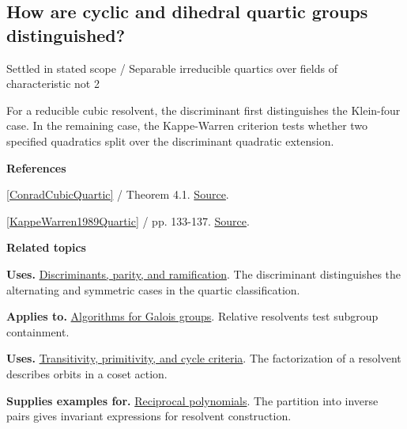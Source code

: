 \documentclass[11pt,a4paper,oneside,openany]{book}
\newenvironment{sources}{\par\smallskip\begingroup\footnotesize\color{atlasgray}\leftskip=10pt\setlength{\parskip}{2pt}}{\par\endgroup\smallskip}
\begin{document}
\subsection*{How are cyclic and dihedral quartic groups distinguished?}
{\small\sffamily\color{atlasgold}Settled in stated scope / Separable irreducible quartics over fields of characteristic not 2}\par\smallskip
\color{black} For a reducible cubic resolvent, the discriminant first distinguishes the Klein-four case. In the remaining case, the Kappe-Warren criterion tests whether two specified quadratics split over the discriminant quadratic extension.\par
\begin{sources}
\textbf{References}\par\smallskip
\noindent\hyperlink{ref:ConradCubicQuartic}{[ConradCubicQuartic]} / Theorem 4.1.  \href{https://kconrad.math.uconn.edu/blurbs/galoistheory/cubicquartic.pdf}{Source}.\par
\noindent\hyperlink{ref:KappeWarren1989Quartic}{[KappeWarren1989Quartic]} / pp. 133-137.  \href{https://www.jstor.org/stable/2323198}{Source}.\par
\end{sources}\color{black}
\par\medskip\begingroup\footnotesize\setlength{\parskip}{1pt}\textbf{\sffamily\color{atlasgreen}Related topics}\par
\color{black}\textbf{Uses.} \hyperlink{article:discriminants}{Discriminants, parity, and ramification}. The discriminant distinguishes the alternating and symmetric cases in the quartic classification.\par
\color{black}\textbf{Applies to.} \hyperlink{article:galois-computation}{Algorithms for Galois groups}. Relative resolvents test subgroup containment.\par
\color{black}\textbf{Uses.} \hyperlink{article:permutation-groups}{Transitivity, primitivity, and cycle criteria}. The factorization of a resolvent describes orbits in a coset action.\par
\color{black}\textbf{Supplies examples for.} \hyperlink{article:reciprocity}{Reciprocal polynomials}. The partition into inverse pairs gives invariant expressions for resolvent construction.\par
\endgroup
\end{document}
